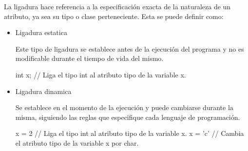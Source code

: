 \documentclass[a4paper,10pt]{article}
\begin{document}
\begin{enumerate}
La ligadura hace referencia a la especificación exacta de la naturaleza de un atributo, ya sea su tipo o clase perteneciente. Esta se puede definir como:

\begin{itemize}
\item Ligadura estatica

Este tipo de ligadura se establece antes de la ejecución del programa y no es modificable durante el tiempo de vida del mismo.

\begin{center}

int x; // Liga el tipo int al atributo tipo de la variable x.

\end{center}

\item Ligadura dinamica

Se establece en el momento de la ejecución y puede cambiarse durante la misma, siguiendo las reglas que especifique cada lenguaje de programación.

\begin{center}

x = 2 // Liga el tipo int al atributo tipo de la variable x.\newline
x = 'c' // Cambia el atributo tipo de la variable x por char.

\end{center}


\end{itemize}

\end{enumerate}
\end{document}
